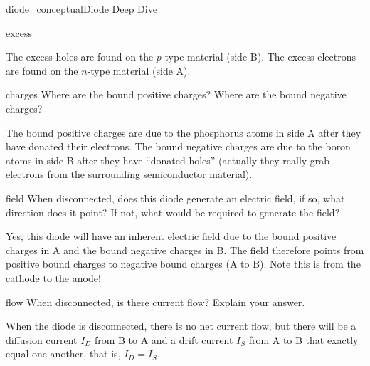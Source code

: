 \begin{mainquestion}{diode_conceptual}{Diode Deep Dive}
\begin{partquestion}{excess}
\begin{answer}
The excess holes are found on the $p$-type material (side B). The excess electrons are found on the $n$-type material (side A).
\end{answer}
\end{partquestion}

\begin{partquestion}{charges}
{Where are the bound positive charges? Where are the bound negative charges?}

\begin{answer}
The bound positive charges are due to the phosphorus atoms in side A after they have donated their electrons. The bound negative charges are due to the boron atoms in side B after they have “donated holes” (actually they really grab electrons from the surrounding semiconductor material).
\end{answer}
\end{partquestion}

\begin{partquestion}{field}
{When disconnected, does this diode generate an electric field, if so, what direction does it point? If not, what would be required to generate the field?}

\begin{answer}
Yes, this diode will have an inherent electric field due to the bound positive charges in A and the bound negative charges in B. The field therefore points from positive bound charges to negative bound charges (A to B). Note this is from the cathode to the anode!
\end{answer}
\end{partquestion}

\begin{partquestion}{flow}
{When disconnected, is there current flow? Explain your answer.}

\begin{answer}
When the diode is disconnected, there is no net current flow, but there will be a diffusion current $I_D$ from B to A and a drift current $I_S$ from A to B that exactly equal one another,
that is, $I_D = I_S$. 
\end{answer}
\end{partquestion}

\end{mainquestion}